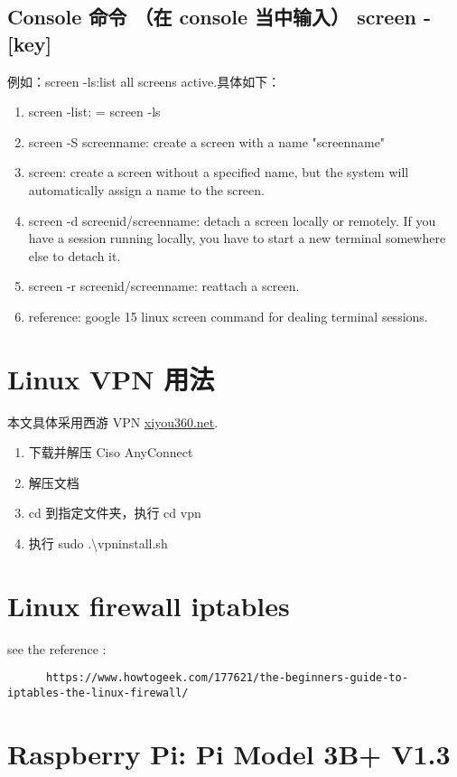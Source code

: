\documentclass[UTF8,fancyhdr,a4paper]{ctexart}
\begin{document}
\subsection{Console 命令 （在 console 当中输入） screen -[key]}
例如：screen -ls:list all screens active.具体如下：
\begin{enumerate}
      \item screen -list: = screen -ls
      \item screen -S screenname: create a screen with a name "screenname"
      \item screen: create a screen without a specified name, but the system will automatically assign a name to the screen.
      \item screen -d screenid/screenname: detach a screen locally or remotely. If you have a session running locally, you have to start a new terminal somewhere else to detach it.
      \item screen -r screenid/screenname: reattach a screen.
      \item reference: google 15 linux screen command for dealing terminal sessions.
\end{enumerate}


\section{Linux VPN 用法}
\cite{0040s}
本文具体采用西游 VPN \url{xiyou360.net}.
\begin{enumerate}
      \item 下载并解压 Ciso AnyConnect
      \item 解压文档
      \item cd 到指定文件夹，执行 cd vpn
      \item 执行 sudo .\textbackslash vpn\textunderscore install.sh
\end{enumerate}

\section{ Linux firewall iptables}
see the reference : \begin{verbatim}
      https://www.howtogeek.com/177621/the-beginners-guide-to-iptables-the-linux-firewall/     
\end{verbatim}




\section{Raspberry Pi: Pi Model 3B+ V1.3}
\end{document}
